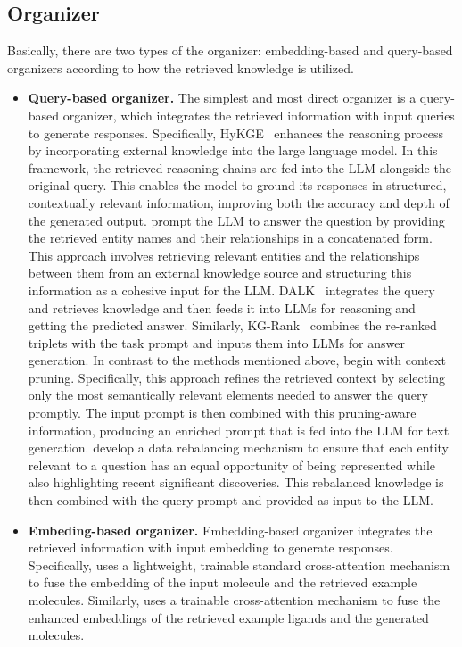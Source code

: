 \subsection{Organizer}
Basically, there are two types
of the organizer: embedding-based and query-based organizers according to how the retrieved knowledge is utilized.


\begin{itemize}[leftmargin=*]
    \item \textbf{Query-based organizer.} The simplest and most direct organizer is a query-based organizer, which integrates the retrieved information with input queries to generate responses. Specifically, HyKGE~\cite{jiang2024hykge} enhances the reasoning process by incorporating external knowledge into the large language model. In this framework, the retrieved reasoning chains are fed into the LLM alongside the original query. This enables the model to ground its responses in structured, contextually relevant information, improving both the accuracy and depth of the generated output. \citet{wu2024medical} prompt the LLM to answer the question by providing the retrieved entity names and their relationships in a concatenated form. This approach involves retrieving relevant entities and the relationships between them from an external knowledge source and structuring this information as a cohesive input for the LLM. DALK~\cite{li2024dalk} integrates the query and retrieves knowledge and then feeds it into LLMs for reasoning and getting the predicted answer. Similarly, KG-Rank~\cite{yang2024kg} combines the re-ranked triplets with the task prompt and inputs them into LLMs for answer generation. In contrast to the methods mentioned above, \citet{soman2024biomedical} begin with context pruning. Specifically, this approach refines the retrieved context by selecting only the most semantically relevant elements needed to answer the query promptly. The input prompt is then combined with this pruning-aware information, producing an enriched prompt that is fed into the LLM for text generation. \citet{delile2024graph} develop a data rebalancing mechanism to ensure that each entity relevant to a question has an equal opportunity of being represented while also highlighting recent significant discoveries. This rebalanced knowledge is then combined with the query prompt and provided as input to the LLM.

    \item \textbf{Embeding-based organizer.} Embedding-based organizer integrates the retrieved information with input embedding to generate responses. Specifically, \citet{wangretrieval} uses a lightweight, trainable standard cross-attention mechanism to fuse the embedding of the input molecule and the retrieved example molecules. Similarly, \citet{huanginteraction} uses a trainable cross-attention mechanism to fuse the enhanced embeddings of the retrieved example ligands and the generated molecules.  

\end{itemize}
